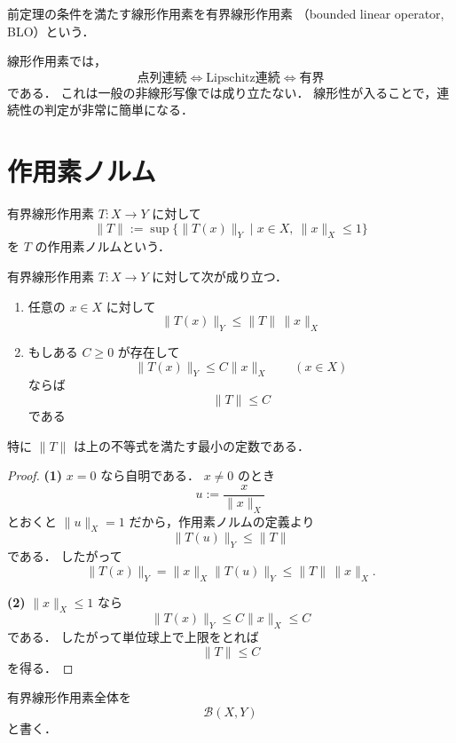 \begin{definition}[有界線形作用素]
前定理の条件を満たす線形作用素を有界線形作用素
（bounded linear operator, BLO）という．
\end{definition}

\begin{remark}
線形作用素では，
\[
\text{点列連続} \iff \text{Lipschitz連続} \iff \text{有界}
\]
である．
これは一般の非線形写像では成り立たない．
線形性が入ることで，連続性の判定が非常に簡単になる．
\end{remark}

\section{作用素ノルム}

\begin{definition}[作用素ノルム]
有界線形作用素 $T:X\to Y$ に対して
\[
\|T\|
:=
\sup\{\|T(x)\|_Y \mid x\in X,\ \|x\|_X\le 1\}
\]
を $T$ の作用素ノルムという．
\end{definition}

\begin{proposition}
有界線形作用素 $T:X\to Y$ に対して次が成り立つ．
\begin{enumerate}
    \item 任意の $x\in X$ に対して
    \[
    \|T(x)\|_Y\le \|T\|\,\|x\|_X
    \]
    \item もしある $C\ge 0$ が存在して
    \[
    \|T(x)\|_Y\le C\|x\|_X
    \qquad (x\in X)
    \]
    ならば
    \[
    \|T\|\le C
    \]
    である
\end{enumerate}
特に $\|T\|$ は上の不等式を満たす最小の定数である．
\end{proposition}
\begin{proof}
\textbf{(1)}\quad
$x=0$ なら自明である．
$x\ne 0$ のとき
\[
u:=\frac{x}{\|x\|_X}
\]
とおくと $\|u\|_X=1$ だから，作用素ノルムの定義より
\[
\|T(u)\|_Y\le \|T\|
\]
である．
したがって
\[
\|T(x)\|_Y
=
\|x\|_X\|T(u)\|_Y
\le
\|T\|\,\|x\|_X.
\]

\textbf{(2)}\quad
$\|x\|_X\le 1$ なら
\[
\|T(x)\|_Y\le C\|x\|_X\le C
\]
である．
したがって単位球上で上限をとれば
\[
\|T\|\le C
\]
を得る．
\end{proof}

\begin{definition}
有界線形作用素全体を
\[
\mathcal B(X,Y)
\]
と書く．
\end{definition}

